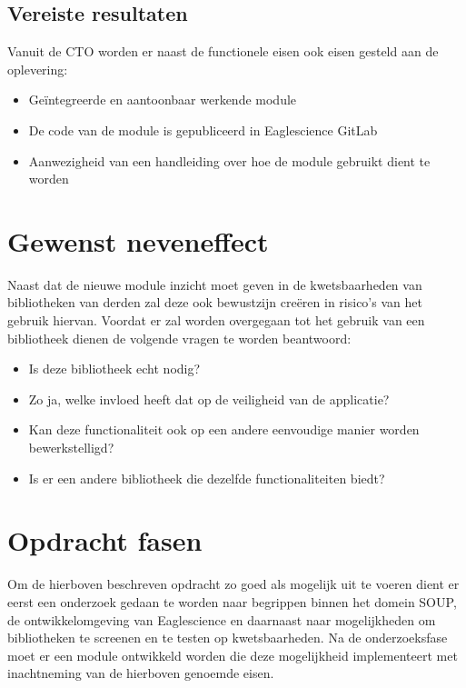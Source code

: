 \subsection{Vereiste resultaten}\label{subsec:deliverables-vereiste-resultaten}
Vanuit de CTO worden er naast de functionele eisen ook eisen gesteld aan de oplevering:
\begin{itemize}
\item Geïntegreerde en aantoonbaar werkende module
\item De code van de module is gepubliceerd in Eaglescience GitLab
\item Aanwezigheid van een handleiding over hoe de module gebruikt dient te worden
\end{itemize}

\section{Gewenst neveneffect}\label{sec:gewenst-neveneffect}
Naast dat de nieuwe module inzicht moet geven in de kwetsbaarheden van bibliotheken van derden zal deze ook bewustzijn creëren in risico's van het gebruik hiervan. Voordat er zal worden overgegaan tot het gebruik van een bibliotheek dienen de volgende vragen te worden beantwoord:
\begin{itemize}
	\item Is deze bibliotheek echt nodig?
	\item Zo ja, welke invloed heeft dat op de veiligheid van de applicatie?
	\item Kan deze functionaliteit ook op een andere eenvoudige manier worden bewerkstelligd?
	\item Is er een andere bibliotheek die dezelfde functionaliteiten biedt?

\end{itemize}


\section{Opdracht fasen}\label{sec:opdracht-fasen}
Om de hierboven beschreven opdracht zo goed als mogelijk uit te voeren dient er eerst een onderzoek gedaan te worden naar begrippen binnen het domein SOUP, de ontwikkelomgeving van Eaglescience en daarnaast naar mogelijkheden om bibliotheken te screenen en te testen op kwetsbaarheden. Na de onderzoeksfase moet er een module ontwikkeld worden die deze mogelijkheid implementeert met inachtneming van de hierboven genoemde eisen.

